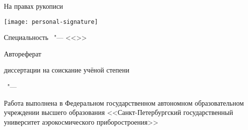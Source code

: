 \thispagestyle{empty}

\vspace{0pt plus1fill} %
\begin{flushright}
  На правах рукописи\par
  \texttt{[image: personal-signature]} 
\end{flushright}

\vspace{0pt plus2fill} %
\begin{center}
 \thesisAuthor
\end{center}

\vspace{0pt plus2fill} %
\begin{center}
\textbf { \thesisTitle}

\vspace{0pt plus3fill} %
{ Специальность \thesisSpecialtyNumber\ "--- <<\thesisSpecialtyTitle>>}

\vspace{0pt plus1.5fill} %
Автореферат\par
диссертации на соискание учёной степени\par \thesisDegree
\end{center}

\vspace{0pt plus4fill} %
\begin{center}
{\thesisCity\ "--- \thesisYear}
\end{center}

\newpage
\thispagestyle{empty}
\noindent Работа выполнена в Федеральном государственном автономном образовательном учреждении высшего образования <<Санкт-Петербургский государственный университет аэрокосмического приборостроения>>

